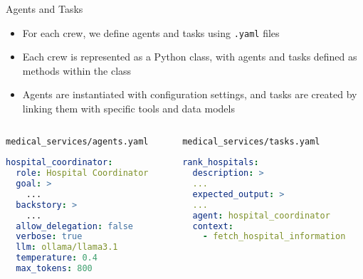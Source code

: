 \begin{frame}[fragile]{Agents and Tasks}
    \begin{itemize}
        \item For each crew, we define agents and tasks using \texttt{.yaml} files
        \item Each crew is represented as a Python class, with agents and tasks defined as methods within the class
        \item Agents are instantiated with configuration settings, and tasks are created by linking them with specific tools and data models
    \end{itemize}
      \begin{columns}
        \begin{column}{0.48\textwidth} %
            \centering%
  \texttt{medical\_services/agents.yaml}
            \begin{lstlisting}[language=yaml]
hospital_coordinator:
  role: Hospital Coordinator
  goal: >
    ...
  backstory: >
    ...
  allow_delegation: false
  verbose: true
  llm: ollama/llama3.1
  temperature: 0.4
  max_tokens: 800

            \end{lstlisting}
        \end{column}
        \begin{column}{0.48\textwidth} %
            \centering
              \texttt{medical\_services/tasks.yaml}
            \begin{lstlisting}[language=yaml]
rank_hospitals:
  description: >
  ...
  expected_output: >
  ...
  agent: hospital_coordinator
  context:
    - fetch_hospital_information
            \end{lstlisting}
        \end{column}
      \end{columns}
\end{frame}